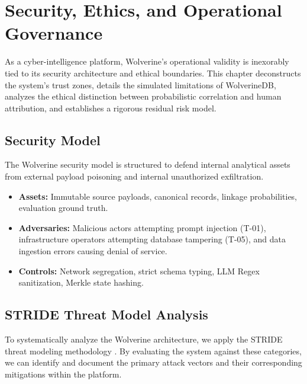 \chapter{Security, Ethics, and Operational Governance}
\label{ch:security-ethics}

As a cyber-intelligence platform, Wolverine's operational validity is inexorably tied to its security architecture 
and ethical boundaries. This chapter deconstructs the system's trust zones, details the simulated limitations of 
WolverineDB, analyzes the ethical distinction between probabilistic correlation and human attribution, and establishes 
a rigorous residual risk model.

\section{Security Model}
\label{sec:sec-model}
The Wolverine security model is structured to defend internal analytical assets from external payload poisoning and 
internal unauthorized exfiltration.
\begin{itemize}
    \item \textbf{Assets:} Immutable source payloads, canonical records, linkage probabilities, evaluation ground truth.
    \item \textbf{Adversaries:} Malicious actors attempting prompt injection (T-01), infrastructure operators attempting 
          database tampering (T-05), and data ingestion errors causing denial of service.
    \item \textbf{Controls:} Network segregation, strict schema typing, LLM Regex sanitization, Merkle state hashing.
\end{itemize}

\section{STRIDE Threat Model Analysis}
\label{sec:stride-threat-model}
To systematically analyze the Wolverine architecture, we apply the STRIDE threat modeling methodology 
\cite{shostack2014threat}. By evaluating the system against these categories, we can identify and document the 
primary attack vectors and their corresponding mitigations within the platform.

